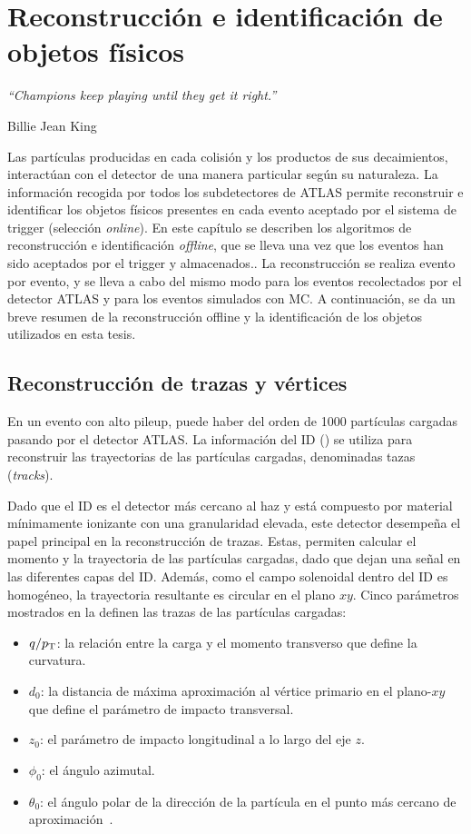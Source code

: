 \chapter{Reconstrucci\'on e identificaci\'on de objetos f\'isicos}
\label{ch:objects}
\epigraph{\emph{“Champions keep playing until they get it right.”}}{Billie Jean King}


Las partículas producidas en cada colisión y los productos de sus decaimientos, interactúan con el detector de una manera particular según su naturaleza. La información recogida por todos los subdetectores de \ac{ATLAS} permite reconstruir e identificar los objetos físicos presentes en cada evento aceptado por el sistema de trigger (selecci\'on \textit{online}). En este cap\'itulo se describen los algoritmos de reconstrucción e identificación \textit{offline}, que se lleva una vez que los eventos han sido aceptados por el trigger y almacenados.. La reconstrucción se realiza evento por evento, y se lleva a cabo del mismo modo para los eventos recolectados por el detector \ac{ATLAS} y para los eventos simulados con \acf{MC}. A continuación, se da un breve resumen de la reconstrucción offline y la identificación de los objetos utilizados en esta tesis.




\section{Reconstrucci\'on de trazas y v\'ertices}

En un evento con alto pileup, puede haber del orden de 1000 partículas cargadas pasando por el detector \ac{ATLAS}. La información del \ac{ID} (\Sect{\ref{subsec:atlas:atlas:id}}) se utiliza para reconstruir las trayectorias de las partículas cargadas, denominadas tazas (\textit{tracks}).

Dado que el \ac{ID} es el detector más cercano al haz y está compuesto por material mínimamente ionizante con una granularidad elevada, este detector desempeña el papel principal en la reconstrucción de trazas. Estas, permiten calcular el momento y la trayectoria de las partículas cargadas, dado que dejan una se\~nal en las diferentes capas del \ac{ID}. Adem\'as, como el campo solenoidal dentro del \ac{ID} es homogéneo, la trayectoria resultante es circular en el plano \(xy\). Cinco parámetros mostrados en la \Fig{\ref{fig:objects:track_vtx:track_parameters}} definen las trazas de las partículas cargadas:
\begin{itemize}
    \item \(q/p_{\text{T}}\): la relación entre la carga y el momento transverso que define la curvatura.
    \item \(d_0\): la distancia de máxima aproximación al vértice primario en el plano-\(xy\) que define el parámetro de impacto transversal.
    \item \(z_0\): el parámetro de impacto longitudinal a lo largo del eje \(z\).
    \item \(\phi_0\): el ángulo azimutal.
    \item \(\theta_0\): el ángulo polar de la dirección de la partícula en el punto más cercano de aproximación~\cite{ATLAS-Tracks-Performance-Run2}.
\end{itemize}

